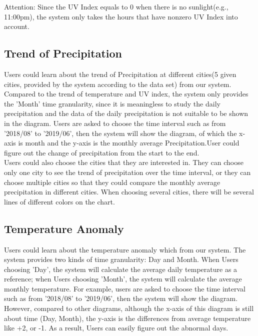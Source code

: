\documentclass[]{article}
\begin{document}
	\noindent Attention: Since the UV Index equals to 0 when there is no sunlight(e.g., 11:00pm), the system only takes the hours that have nonzero UV Index into account. 
	
	\subsection{Trend of Precipitation}
	
	Users could learn about the trend of Precipitation at different cities(5 given cities, provided by the system according to the data set) from our system. Compared to the trend of temperature and UV index, the system only provides the 'Month' time granularity, since it is meaningless to study the daily precipitation and the data of the daily precipitation is not suitable to be shown in the diagram. Users are asked to choose the time interval such as from '2018/08' to '2019/06', then the system will show the diagram, of which the x-axis is month and the y-axis is the monthly average Precipitation.User could figure out the change of precipitation from the start to the end.     \\
	
	\noindent Users could also choose the cities that they are interested in. They can choose only one city to see the trend of precipitation over the time interval, or they can choose multiple cities so that they could compare the monthly average precipitation in different cities. When choosing several cities, there will be several lines of different colors on the chart.   
	
	\subsection{Temperature Anomaly}
	
	Users could learn about the temperature anomaly which from our system. The system provides two kinds of time granularity: Day and Month. When Users choosing 'Day', the system will calculate the average daily temperature as a reference; when Users choosing 'Month', the system will calculate the average monthly temperature. For example, users are asked to choose the time interval such as from '2018/08' to '2019/06', then the system will show the diagram. However, compared to other diagrams, although the x-axis of this diagram is still about time (Day, Month), the y-axis is the differences from average temperature like +2, or -1. As a result, Users can easily figure out the abnormal days.     \\
	
\end{document}
